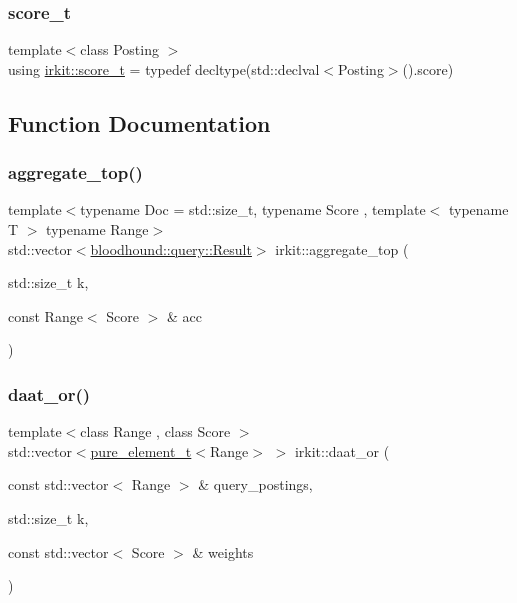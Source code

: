 \mbox{\label{namespaceirkit_a754dabe3346f950c948e7596d9d46c71}} 
\subsubsection{\texorpdfstring{score\+\_\+t}{score\_t}}
{\footnotesize\ttfamily template$<$class Posting $>$ \\
using \hyperlink{namespaceirkit_a754dabe3346f950c948e7596d9d46c71}{irkit\+::score\+\_\+t} = typedef decltype(std\+::declval$<$Posting$>$().score)}



\subsection{Function Documentation}
\mbox{\label{namespaceirkit_aabff8eec068dbbd05abad382861327de}} 
\subsubsection{\texorpdfstring{aggregate\+\_\+top()}{aggregate\_top()}}
{\footnotesize\ttfamily template$<$typename Doc  = std\+::size\+\_\+t, typename Score , template$<$ typename T $>$ typename Range$>$ \\
std\+::vector$<$\hyperlink{structbloodhound_1_1query_1_1Result}{bloodhound\+::query\+::\+Result}$>$ irkit\+::aggregate\+\_\+top (\begin{DoxyParamCaption}\item[{std\+::size\+\_\+t}]{k,  }\item[{const Range$<$ Score $>$ \&}]{acc }\end{DoxyParamCaption})}

\mbox{\label{namespaceirkit_ad6a1763616725ecb88e751ea7eb93453}} 
\subsubsection{\texorpdfstring{daat\+\_\+or()}{daat\_or()}}
{\footnotesize\ttfamily template$<$class Range , class Score $>$ \\
std\+::vector$<$\hyperlink{namespaceirkit_afcffab67300c5c703cb38a363c9a6f1d}{pure\+\_\+element\+\_\+t}$<$Range$>$ $>$ irkit\+::daat\+\_\+or (\begin{DoxyParamCaption}\item[{const std\+::vector$<$ Range $>$ \&}]{query\+\_\+postings,  }\item[{std\+::size\+\_\+t}]{k,  }\item[{const std\+::vector$<$ Score $>$ \&}]{weights }\end{DoxyParamCaption})}

